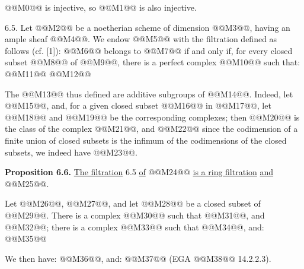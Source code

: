 @@M0@@
is injective, so @@M1@@ is also injective.

6.5. Let @@M2@@ be a noetherian scheme of dimension @@M3@@, having an ample sheaf @@M4@@. We endow @@M5@@ with the filtration defined as follows (cf. [1]): @@M6@@ belongs to @@M7@@ if and only if, for every closed subset @@M8@@ of @@M9@@, there is a perfect complex @@M10@@ such that:
@@M11@@
@@M12@@

The @@M13@@ thus defined are additive subgroups of @@M14@@. Indeed, let @@M15@@, and, for a given closed subset @@M16@@ in @@M17@@, let @@M18@@ and @@M19@@ be the corresponding complexes; then @@M20@@ is the class of the complex @@M21@@, and
@@M22@@
since the codimension of a finite union of closed subsets is the infimum of the codimensions of the closed subsets, we indeed have @@M23@@.

\textbf{Proposition 6.6.} \uline{The filtration} 6.5 \uline{of} @@M24@@ \uline{is a ring filtration} \uline{and} @@M25@@.

Let @@M26@@, @@M27@@, and let @@M28@@ be a closed subset of @@M29@@. There is a complex @@M30@@ such that @@M31@@, and @@M32@@; there is a complex @@M33@@ such that @@M34@@, and:
@@M35@@

We then have: @@M36@@, and:
@@M37@@
(EGA @@M38@@ 14.2.2.3).

